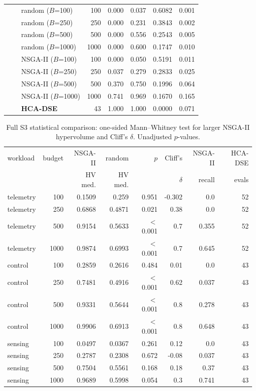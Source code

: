 \documentclass[preprint,11pt,3p]{elsarticle}
\begin{document}
\begin{table}[!htbp]
\begin{tabular}{lllrrrrr}
 & & random ($B$=100) & 100 & 0.000 & 0.037 & 0.6082 & 0.001 \\
 & & random ($B$=250) & 250 & 0.000 & 0.231 & 0.3843 & 0.002 \\
 & & random ($B$=500) & 500 & 0.000 & 0.556 & 0.2543 & 0.005 \\
 & & random ($B$=1000) & 1000 & 0.000 & 0.600 & 0.1747 & 0.010 \\
 & & NSGA-II ($B$=100) & 100 & 0.000 & 0.050 & 0.5191 & 0.011 \\
 & & NSGA-II ($B$=250) & 250 & 0.037 & 0.279 & 0.2833 & 0.025 \\
 & & NSGA-II ($B$=500) & 500 & 0.370 & 0.750 & 0.1996 & 0.064 \\
 & & NSGA-II ($B$=1000) & 1000 & 0.741 & 0.969 & 0.1670 & 0.165 \\
 & & \textbf{HCA-DSE} & 43 & 1.000 & 1.000 & 0.0000 & 0.071 \\
\bottomrule
\end{tabular}
\end{table}
\clearpage
\begin{table}[!htbp]\centering
\caption{Full S3 statistical comparison: one-sided Mann--Whitney test for larger NSGA-II hypervolume and Cliff's $\delta$. Unadjusted $p$-values.}
\scriptsize
\setlength{\tabcolsep}{3.5pt}
\begin{tabular}{lrrrrrrr}
\toprule
workload & budget & NSGA-II & random & $p$ & Cliff's & NSGA-II & HCA-DSE \\
 & & HV med. & HV med. & & $\delta$ & recall & evals \\
\midrule
telemetry & 100 & 0.1509 & 0.259 & 0.951 & -0.302 & 0.0 & 52 \\
telemetry & 250 & 0.6868 & 0.4871 & 0.021 & 0.38 & 0.0 & 52 \\
telemetry & 500 & 0.9154 & 0.5633 & $<$0.001 & 0.7 & 0.355 & 52 \\
telemetry & 1000 & 0.9874 & 0.6993 & $<$0.001 & 0.7 & 0.645 & 52 \\
control & 100 & 0.2859 & 0.2616 & 0.484 & 0.01 & 0.0 & 43 \\
control & 250 & 0.7481 & 0.4916 & $<$0.001 & 0.62 & 0.037 & 43 \\
control & 500 & 0.9331 & 0.5644 & $<$0.001 & 0.8 & 0.278 & 43 \\
control & 1000 & 0.9906 & 0.6913 & $<$0.001 & 0.8 & 0.648 & 43 \\
sensing & 100 & 0.0497 & 0.0367 & 0.261 & 0.12 & 0.0 & 43 \\
sensing & 250 & 0.2787 & 0.2308 & 0.672 & -0.08 & 0.037 & 43 \\
sensing & 500 & 0.7504 & 0.5561 & 0.168 & 0.18 & 0.37 & 43 \\
sensing & 1000 & 0.9689 & 0.5998 & 0.054 & 0.3 & 0.741 & 43 \\
\bottomrule
\end{tabular}
\end{table}
\end{document}
